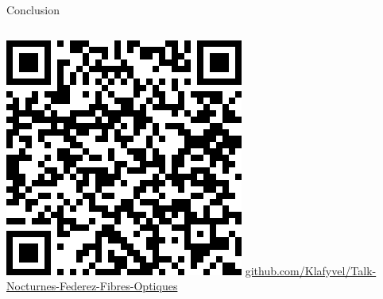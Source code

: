 \documentclass[aspectratio=149, 10pt, t]{beamer}
\begin{document}
\begin{frame}{Conclusion}
\begin{columns}
\begin{column}{0.6\linewidth}
            \includegraphics[width=0.5\linewidth]{images/qrcode}
            {\footnotesize \href{https://github.com/Klafyvel/Talk-Nocturnes-Federez-Fibres-Optiques}{github.com/Klafyvel/Talk-Nocturnes-Federez-Fibres-Optiques}}
        \end{column}
    \end{columns}
\end{frame}
\end{document}
